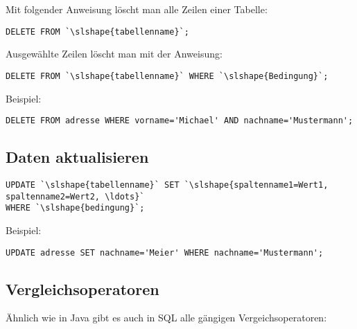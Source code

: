 Mit folgender Anweisung löscht man alle Zeilen einer Tabelle:

\begin{lstlisting}
DELETE FROM `\slshape{tabellenname}`;
\end{lstlisting}

Ausgewählte Zeilen löscht man mit der Anweisung:

\begin{lstlisting}
DELETE FROM `\slshape{tabellenname}` WHERE `\slshape{Bedingung}`;
\end{lstlisting}

Beispiel:

\begin{lstlisting}
DELETE FROM adresse WHERE vorname='Michael' AND nachname='Mustermann';
\end{lstlisting}


\subsection{Daten aktualisieren}

\begin{lstlisting}
UPDATE `\slshape{tabellenname}` SET `\slshape{spaltenname1=Wert1, spaltenname2=Wert2, \ldots}`
WHERE `\slshape{bedingung}`;
\end{lstlisting}

Beispiel:

\begin{lstlisting}
UPDATE adresse SET nachname='Meier' WHERE nachname='Mustermann';
\end{lstlisting}


\subsection{Vergleichsoperatoren}

Ähnlich wie in Java gibt es auch in SQL alle gängigen Vergeichsoperatoren:

